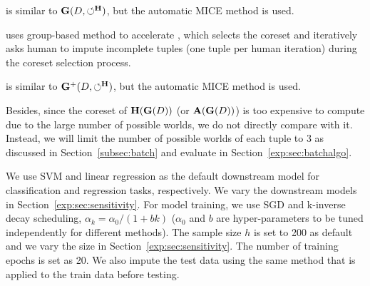  is similar to $\mathbf{G}(D,\circlearrowleft^\mathbf{H})$, but the automatic  MICE  method is used.

 uses group-based method to accelerate \ours, which selects the coreset and iteratively asks human to impute incomplete tuples (one tuple per human iteration) during the coreset selection process.

 is similar to $\mathbf{G}^+(D,\circlearrowleft^\mathbf{H})$, but the automatic  MICE  method is used.


Besides, since the coreset of $\mathbf{H}(\mathbf{G}(D))$ (or $\mathbf{A}(\mathbf{G}(D))$) is too expensive to compute due to the large number of possible worlds, we do not directly compare with it. Instead, we will limit the number of possible worlds of each tuple to 3 as discussed in Section~\ref{subsec:batch} and evaluate in Section~\ref{exp:sec:batchalgo}.



 







We use SVM and linear regression as the default downstream model for classification and regression tasks, respectively. We vary the downstream models in Section~\ref{exp:sec:sensitivity}. For model training, we use SGD and k-inverse decay  scheduling, \ie $\alpha_k = \alpha_0 / (1+bk)$ ($\alpha_0$ and $b$ are hyper-parameters to be tuned independently for different methods).  The sample size $h$ is set to 200 as default and we vary the  size in Section~\ref{exp:sec:sensitivity}. The number of training epochs is set as 20. %
We also impute the test data using the same method that is applied to the train data before testing.
